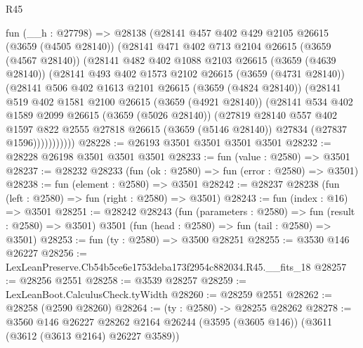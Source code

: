 \begin{lexlean}{R45}
\begin{coremodule}
      fun (__h : @27798) =>
      @28138
        (@28141
          @457
          @402
          @429
          @2105
          @26615
          (@3659 (@4505 @28140))
          (@28141
            @471
            @402
            @713
            @2104
            @26615
            (@3659 (@4567 @28140))
            (@28141
              @482
              @402
              @1088
              @2103
              @26615
              (@3659 (@4639 @28140))
              (@28141
                @493
                @402
                @1573
                @2102
                @26615
                (@3659 (@4731 @28140))
                (@28141
                  @506
                  @402
                  @1613
                  @2101
                  @26615
                  (@3659 (@4824 @28140))
                  (@28141
                    @519
                    @402
                    @1581
                    @2100
                    @26615
                    (@3659 (@4921 @28140))
                    (@28141
                      @534
                      @402
                      @1589
                      @2099
                      @26615
                      (@3659 (@5026 @28140))
                      (@27819
                        @28140
                        @557
                        @402
                        @1597
                        @822
                        @2555
                        @27818
                        @26615
                        (@3659 (@5146 @28140))
                        @27834
                        (@27837 @1596)))))))))))
@28228 := @26193 @3501 @3501 @3501 @3501
@28232 := @28228 @26198 @3501 @3501 @3501
@28233 := fun (value : @2580) => @3501
@28237 := @28232 @28233 (fun (ok : @2580) => fun (error : @2580) => @3501)
@28238 := fun (element : @2580) => @3501
@28242 := @28237 @28238 (fun (left : @2580) => fun (right : @2580) => @3501)
@28243 := fun (index : @16) => @3501
@28251 := @28242
    @28243
    (fun (parameters : @2580) => fun (result : @2580) => @3501)
    @3501
    (fun (head : @2580) => fun (tail : @2580) => @3501)
@28253 := fun (ty : @2580) => @3500 @28251
@28255 := @3530 @146 @26227
@28256 := LexLeanPreserve.Cb54b5ce6e1753deba173f2954c882034.R45.__fits_18
@28257 := @28256 @2551
@28258 := @3539 @28257
@28259 := LexLeanBoot.CalculusCheck.tyWidth
@28260 := @28259 @2551
@28262 := @28258 (@2590 @28260)
@28264 := (ty : @2580) -> @28255 @28262
@28278 := @3560
    @146
    @26227
    @28262
    @2164
    @26244
    (@3595 (@3605 @146))
    (@3611 (@3612 (@3613 @2164) @26227 @3589))

\end{coremodule}
\end{lexlean}
